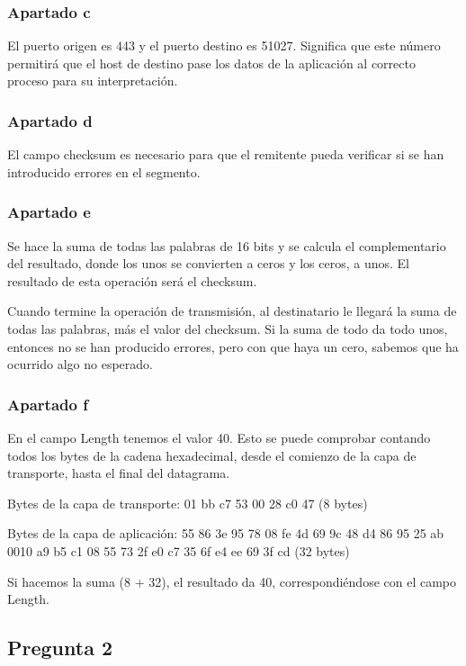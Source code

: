 \documentclass[spanish]{report} %
\begin{document}
\subsubsection{Apartado c}
El puerto origen es 443 y el puerto destino es 51027. Significa que este número
permitirá que el host de destino pase los datos de la aplicación al correcto
proceso para su interpretación.


\subsubsection{Apartado d}
El campo checksum es necesario para que el remitente pueda verificar si se han
introducido errores en el segmento.


\subsubsection{Apartado e}
Se hace la suma de todas las palabras de 16 bits y se calcula el complementario
del resultado, donde los unos se convierten a ceros y los ceros, a unos. El
resultado de esta operación será el checksum.\newline

Cuando termine la operación de transmisión, al destinatario le llegará la suma
de todas las palabras, más el valor del checksum. Si la suma de todo da todo
unos, entonces no se han producido errores, pero con que haya un cero, sabemos
que ha ocurrido algo no esperado.

\subsubsection{Apartado f}
En el campo Length tenemos el valor 40. Esto se puede comprobar contando todos
los bytes de la cadena hexadecimal, desde el comienzo de la capa de transporte,
hasta el final del datagrama.\newline

Bytes de la capa de transporte: 01 bb c7 53 00 28 c0 47 (8 bytes)\newline

Bytes de la capa de aplicación: 55 86 3e 95 78 08 fe 4d 69 9c 48 d4 86 95 25 ab
0010   a9 b5 c1 08 55 73 2f e0 c7 35 6f e4 ee 69 3f cd (32 bytes)\newline

Si hacemos la suma (8 + 32), el resultado da 40, correspondiéndose con el campo
Length.

\subsection{Pregunta 2}
\end{document}
